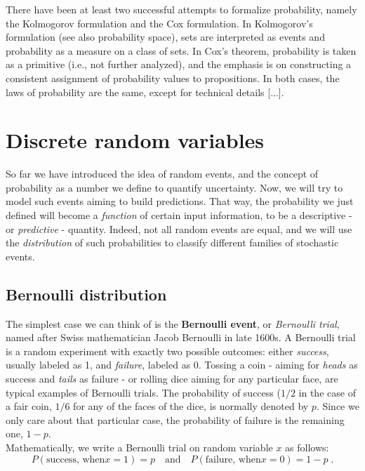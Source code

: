 \documentclass{book}
\begin{document}
\medskip

There have been at least two successful attempts to formalize probability, namely the Kolmogorov formulation and the Cox formulation. In Kolmogorov's formulation (see also probability space), sets are interpreted as events and probability as a measure on a class of sets. In Cox's theorem, probability is taken as a primitive (i.e., not further analyzed), and the emphasis is on constructing a consistent assignment of probability values to propositions. In both cases, the laws of probability are the same, except for technical details [...].\\

\section{Discrete random variables}

So far we have introduced the idea of random events, and the concept of probability as a number we define to quantify uncertainty. Now, we will try to model such events aiming to build predictions. That way, the probability we just defined will become a \textit{function} of certain input information, to be a descriptive - or \textit{predictive} - quantity. Indeed, not all random events are equal, and we will use the \textit{distribution} of such probabilities to classify different families of stochastic events.
  
 \subsection{Bernoulli distribution}

The simplest case we can think of is the \textbf{Bernoulli event}, or \textit{Bernoulli trial}, named after Swiss mathematician Jacob Bernoulli in late 1600s. A Bernoulli trial is a random experiment with exactly two possible outcomes: either \textit{success}, usually labeled as 1, and \textit{failure}, labeled as 0. Tossing a coin - aiming for \textit{heads} as success and \textit{tails} as failure - or rolling dice aiming for any particular face, are typical examples of Bernoulli trials. The probability of success ($1/2$ in the case of a fair coin, $1/6$ for any of the faces of the dice, is normally denoted by $p$. Since we only care about that particular case, the probability of failure is the remaining one, $1 - p$.\\

Mathematically, we write a Bernoulli trial on random variable $x$ as follows:
\begin{equation}
	P(\text{success, when} x = 1) = p \quad \text{and} \quad P(\text{failure, when} x = 0) = 1 - p \; .
	\label{eq:bernoulli}
\end{equation}
\end{document}
